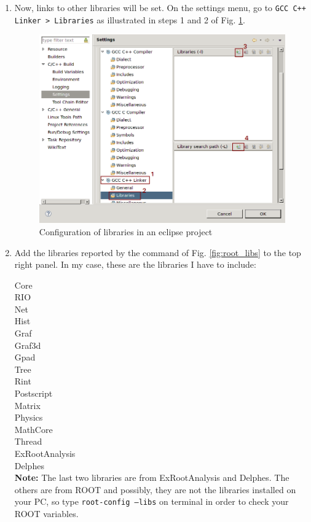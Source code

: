 \documentclass[12pt, oneside]{book}              %
\begin{document}
\begin{enumerate}
\item Now, links to other libraries will be set. On the settings menu, go to \texttt{GCC C++ Linker >
 Libraries} as illustrated in steps 1 and 2 of Fig. \ref{fig:Prop_project_eclipse_2}.

\begin{figure}[h]
\centering
\includegraphics[width=0.7\linewidth]{Imags_Doc/Prop_project_eclipse_2}
\caption[Configuration of libraries in an eclipse project]{Configuration of libraries in an eclipse project}
\label{fig:Prop_project_eclipse_2}
\end{figure}

\item Add the libraries reported by the command of Fig. \ref{fig:root_libs} to the top right panel.
In my case, these are the libraries I have to include:

Core \\
RIO \\
Net \\
Hist \\
Graf \\
Graf3d \\
Gpad \\
Tree \\
Rint \\
Postscript \\
Matrix \\
Physics \\
MathCore \\
Thread \\
ExRootAnalysis \\
Delphes \\

\textbf{Note:} The last two libraries are from ExRootAnalysis and Delphes. The others
are from ROOT and possibly, they are not the libraries installed on your PC, so type
\texttt{root-config --libs} on terminal in order to check your ROOT variables.


\end{enumerate}
\end{document}
